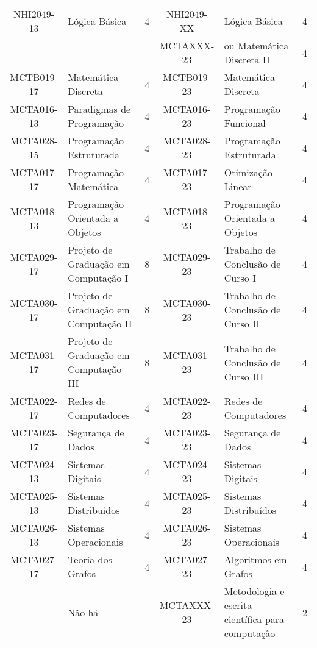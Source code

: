 \begin{table}[h!]
{\begin{tabular}{|c|p{}|c||c|p{}|c|}
    NHI2049-13 & Lógica Básica & 4 & NHI2049-XX & Lógica Básica & 4 \\
    & & & MCTAXXX-23 & ou Matemática Discreta II & 4 \\ \hline
    MCTB019-17 & Matemática Discreta & 4 & MCTB019-23 & Matemática Discreta & 4 \\ \hline
    MCTA016-13 & Paradigmas de Programação & 4 & MCTA016-23 & Programação Funcional & 4 \\ \hline
    MCTA028-15 & Programação Estruturada & 4 & MCTA028-23 & Programação Estruturada & 4 \\ \hline
    MCTA017-17 & Programação Matemática & 4 & MCTA017-23 & Otimização Linear & 4 \\ \hline
    MCTA018-13 & Programação Orientada a Objetos & 4 & MCTA018-23 & Programação Orientada a Objetos & 4 \\ \hline
    MCTA029-17 & Projeto de Graduação em Computação I & 8 & MCTA029-23 & Trabalho de Conclusão de Curso I & 4 \\ \hline
    MCTA030-17 & Projeto de Graduação em Computação II & 8 & MCTA030-23 & Trabalho de Conclusão de Curso II & 4 \\ \hline
    MCTA031-17 & Projeto de Graduação em Computação III & 8 & MCTA031-23 & Trabalho de Conclusão de Curso III & 4 \\ \hline
    MCTA022-17 & Redes de Computadores & 4 & MCTA022-23 & Redes de Computadores & 4 \\ \hline
    MCTA023-17 & Segurança de Dados & 4 & MCTA023-23 & Segurança de Dados & 4 \\ \hline
    MCTA024-13 & Sistemas Digitais & 4 & MCTA024-23 & Sistemas Digitais & 4 \\ \hline
    MCTA025-13 & Sistemas Distribuídos & 4 & MCTA025-23 & Sistemas Distribuídos & 4 \\ \hline
    MCTA026-13 & Sistemas Operacionais & 4 & MCTA026-23 & Sistemas Operacionais & 4 \\ \hline
    MCTA027-17 & Teoria dos Grafos & 4 & MCTA027-23 & Algoritmos em Grafos & 4 \\ \hline
     & Não há & & MCTAXXX-23 & Metodologia e escrita científica para computação & 2 \\ \hline
\end{tabular}
}
\end{table}

\newpage

